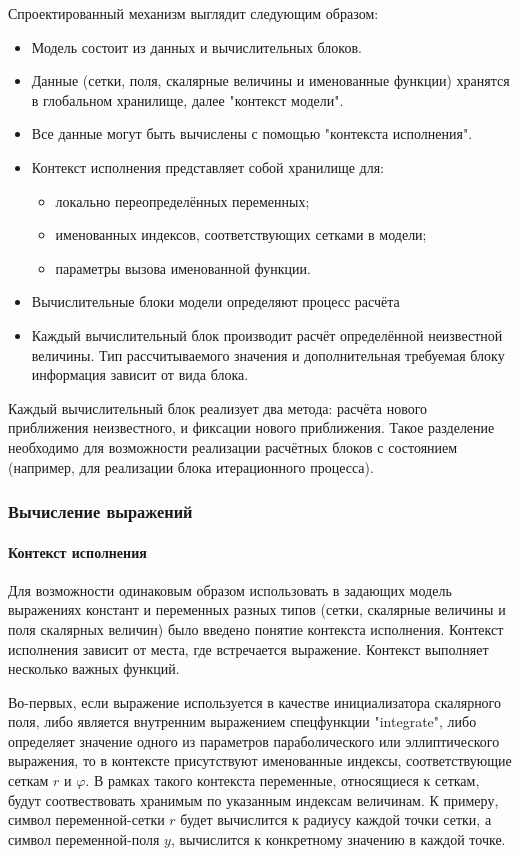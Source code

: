 Спроектированный механизм выглядит следующим образом:
\begin{itemize}
    \item Модель состоит из данных и вычислительных блоков.
    \item Данные (сетки, поля, скалярные величины и именованные функции) 
    хранятся в глобальном хранилище, далее "контекст модели".
    \item Все данные могут быть вычислены с помощью "контекста исполнения".
    \item Контекст исполнения представляет собой хранилище для:
    \begin{itemize}
        \item локально переопределённых переменных;
        \item именованных индексов, соответствующих сетками в модели;
        \item параметры вызова именованной функции.
    \end{itemize}
    \item Вычислительные блоки модели определяют процесс расчёта
    \item Каждый вычислительный блок производит расчёт определённой неизвестной 
    величины. Тип рассчитываемого значения и дополнительная требуемая блоку 
    информация зависит от вида блока.
\end{itemize}

Каждый вычислительный блок реализует два метода: расчёта нового приближения 
неизвестного, и фиксации нового приближения. Такое разделение необходимо для 
возможности реализации расчётных блоков с состоянием (например, для реализации 
блока итерационного процесса).

\subsubsection{Вычисление выражений}
\paragraph{Контекст исполнения}
Для возможности одинаковым образом использовать в задающих модель выражениях 
констант и переменных разных типов (сетки, скалярные величины и поля скалярных 
величин) было введено понятие контекста исполнения. Контекст исполнения зависит 
от места, где встречается выражение. Контекст выполняет несколько важных 
функций.

Во-первых, если выражение используется в качестве инициализатора скалярного 
поля, либо является внутренним выражением спецфункции "integrate", либо 
определяет значение одного из параметров параболического или эллиптического 
выражения, то в контексте присутствуют именованные индексы, соответствующие 
сеткам $r$ и $\varphi$. В рамках такого контекста переменные, относящиеся к 
сеткам, будут соотвествовать хранимым по указанным индексам величинам. К 
примеру, символ переменной-сетки $r$ будет вычислится к радиусу каждой точки 
сетки, а символ переменной-поля $y$, вычислится к конкретному значению в каждой 
точке.

